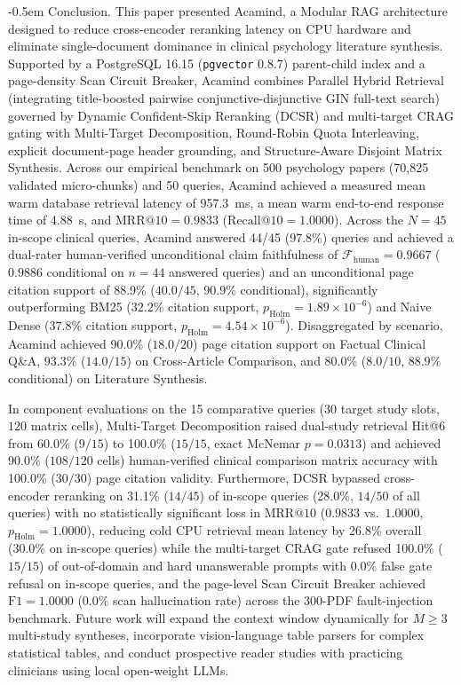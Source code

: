 \documentclass[10pt]{SPIIRAS_Proceedings}
\makeatletter
\renewcommand\section{\@startsection{section}{1}{\parindent}%
  {\z@}%
  {-0.5em}%
  {\normalfont\normalsize\bfseries}}
\makeatother
\begin{document}
\section{Conclusion.} This paper presented Acamind, a Modular RAG architecture designed to reduce cross-encoder reranking latency on CPU hardware and eliminate single-document dominance in clinical psychology literature synthesis. Supported by a PostgreSQL 16.15 (\texttt{pgvector} 0.8.7) parent-child index and a page-density Scan Circuit Breaker, Acamind combines Parallel Hybrid Retrieval (integrating title-boosted pairwise conjunctive-disjunctive GIN full-text search) governed by Dynamic Confident-Skip Reranking (DCSR) and multi-target CRAG gating with Multi-Target Decomposition, Round-Robin Quota Interleaving, explicit document-page header grounding, and Structure-Aware Disjoint Matrix Synthesis. Across our empirical benchmark on 500 psychology papers (70,825 validated micro-chunks) and 50 queries, Acamind achieved a measured mean warm database retrieval latency of 957.3~ms, a mean warm end-to-end response time of 4.88~s, and $\mathrm{MRR@10} = 0.9833$ ($\mathrm{Recall@10} = 1.0000$). Across the $N = 45$ in-scope clinical queries, Acamind answered 44/45 (97.8\%) queries and achieved a dual-rater human-verified unconditional claim faithfulness of $\mathcal{F}_{\mathrm{human}} = 0.9667$ ($0.9886$ conditional on $n = 44$ answered queries) and an unconditional page citation support of 88.9\% ($40.0/45$, $90.9\%$ conditional), significantly outperforming BM25 ($32.2\%$ citation support, $p_{\mathrm{Holm}} = 1.89 \times 10^{-6}$) and Naive Dense ($37.8\%$ citation support, $p_{\mathrm{Holm}} = 4.54 \times 10^{-6}$). Disaggregated by scenario, Acamind achieved 90.0\% ($18.0/20$) page citation support on Factual Clinical Q\&A, 93.3\% ($14.0/15$) on Cross-Article Comparison, and 80.0\% ($8.0/10$, $88.9\%$ conditional) on Literature Synthesis.

In component evaluations on the 15 comparative queries ($30$ target study slots, $120$ matrix cells), Multi-Target Decomposition raised dual-study retrieval Hit@6 from 60.0\% ($9/15$) to 100.0\% ($15/15$, exact McNemar $p = 0.0313$) and achieved 90.0\% ($108/120$ cells) human-verified clinical comparison matrix accuracy with 100.0\% ($30/30$) page citation validity. Furthermore, DCSR bypassed cross-encoder reranking on 31.1\% ($14/45$) of in-scope queries (28.0\%, $14/50$ of all queries) with no statistically significant loss in $\mathrm{MRR@10}$ ($0.9833$ vs.\ $1.0000$, $p_{\mathrm{Holm}} = 1.0000$), reducing cold CPU retrieval mean latency by 26.8\% overall (30.0\% on in-scope queries) while the multi-target CRAG gate refused 100.0\% ($15/15$) of out-of-domain and hard unanswerable prompts with 0.0\% false gate refusal on in-scope queries, and the page-level Scan Circuit Breaker achieved $\mathrm{F1} = 1.0000$ ($0.0\%$ scan hallucination rate) across the 300-PDF fault-injection benchmark. Future work will expand the context window dynamically for $M \ge 3$ multi-study syntheses, incorporate vision-language table parsers for complex statistical tables, and conduct prospective reader studies with practicing clinicians using local open-weight LLMs.
\end{document}
